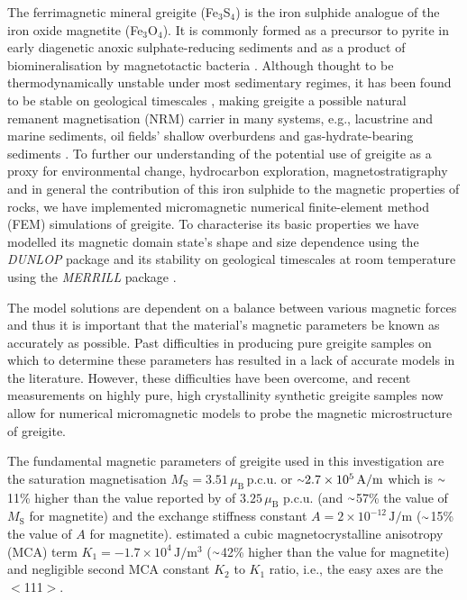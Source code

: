 \documentclass[review,authoryear]{elsarticle}
\newcommand{\roughly}{{\raise.17ex\hbox{$\scriptstyle\sim$}}}
\begin{document}
The ferrimagnetic mineral greigite (Fe$_3$S$_4$) is the iron sulphide analogue of the iron oxide magnetite (Fe$_3$O$_4$). It is commonly formed as a precursor to pyrite in early diagenetic anoxic sulphate-reducing sediments \citep{Berner1984, Hunger2007} and as a product of biomineralisation by magnetotactic bacteria \citep{Mann1990}. Although thought to be thermodynamically unstable under most sedimentary regimes, it has been found to be stable on geological timescales \citep{Roberts2011}, making greigite a possible natural remanent magnetisation (NRM) carrier in many systems, e.g., lacustrine \citep{Babinszki2007, Ron2007} and marine \citep{Roberts1993, Roberts2005, Rowan2006, Rowan2009} sediments, oil fields' shallow overburdens \citep{Abubakar2015, Donovan1984, Reynolds1993} and gas-hydrate-bearing sediments \citep{Larrasoana2007}. To further our understanding of the potential use of greigite as a proxy for environmental change, hydrocarbon exploration, magnetostratigraphy and in general the contribution of this iron sulphide to the magnetic properties of rocks, we have implemented micromagnetic numerical finite-element method (FEM) simulations of greigite. To characterise its basic properties we have modelled its magnetic domain state's shape and size dependence using the \textit{DUNLOP} package \citep{Nagy2016} and its stability on geological timescales at room temperature using the \textit{MERRILL} package \citep{Nagy2017}.\par

The model solutions are dependent on a balance between various magnetic forces and thus it is important that the material's magnetic parameters be known as accurately as possible. Past difficulties in producing pure greigite samples on which to determine these parameters has resulted in a lack of accurate models in the literature. However, these difficulties have been overcome, and recent measurements on highly pure, high crystallinity synthetic greigite samples \citep{Chang2008,Chang2009,Guowei2014,Winklhofer2014} now allow for numerical micromagnetic models to probe the magnetic microstructure of greigite.\par

The fundamental magnetic parameters of greigite used in this investigation are the saturation magnetisation $M_\text{S}=3.51\,\mu_\text{B}\,\text{p.c.u.}$ \citep{Guowei2014} or $\roughly 2.7 \times 10^5\,\text{A/m}$  which is $\roughly$11\% higher than the value reported by \citet{Chang2009} of $3.25\,\mu_\text{B}$ p.c.u. (and $\roughly$57\% the value of  $M_\text{S}$ for magnetite) and the exchange stiffness constant $A=2\times10^{-12}\,\text{J}/\text{m}$ \citep{Chang2008} ($\roughly$15\% the value of $A$ for magnetite). \citet{Winklhofer2014} estimated a cubic magnetocrystalline anisotropy (MCA) term $K_1=-1.7\times10^4\,\text{J}/\text{m}^3$ ($\roughly$42\% higher than the value for magnetite) and negligible second MCA constant $K_2$ to $K_1$ ratio, i.e., the easy axes are the $<$111$>$.\par
\end{document}
